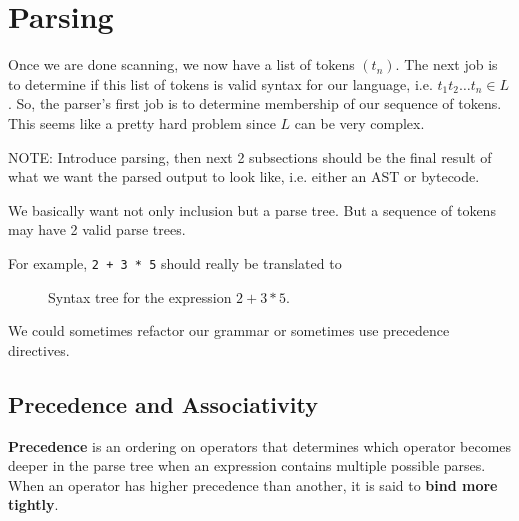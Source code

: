 \section{Parsing}  

  Once we are done scanning, we now have a list of tokens $(t_n)$. The next job is to determine if this list of tokens is valid syntax for our language, i.e. $t_1 t_2 \ldots t_n \in L$. So, the parser's first job is to determine membership of our sequence of tokens. This seems like a pretty hard problem since $L$ can be very complex. 


  NOTE: Introduce parsing, then next 2 subsections should be the final result of what we want the parsed output to look like, i.e. either an AST or bytecode. 

  We basically want not only inclusion but a parse tree. But a sequence of tokens may have 2 valid parse trees. 

  \begin{example}
    \label{ex:precedence-in-the-parse-tree-of-23times5}
    For example, \texttt{2 + 3 * 5} should really be translated to 

    \begin{figure}[H]
      \centering
      \caption{Syntax tree for the expression $2 + 3 * 5$.}
      \label{fig:syntax-tree-2-plus-3-times-5}
    \end{figure}
  \end{example}

  We could sometimes refactor our grammar or sometimes use precedence directives. 

\subsection{Precedence and Associativity} 

  \begin{definition}[Precedence]
    \label{def:precedence}
    \textbf{Precedence} is an ordering on operators that determines which operator becomes deeper in the parse tree when an expression contains multiple possible parses. When an operator has higher precedence than another, it is said to \textbf{bind more tightly}. 
  \end{definition}

